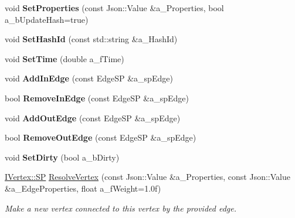 \begin{DoxyCompactItemize}
void {\bfseries Set\+Properties} (const Json\+::\+Value \&a\+\_\+\+Properties, bool a\+\_\+b\+Update\+Hash=true)
\item 
\mbox{\label{class_i_graph_1_1_i_vertex_aec151462d4cf7a56ed519dcacd9984f2}} 
void {\bfseries Set\+Hash\+Id} (const std\+::string \&a\+\_\+\+Hash\+Id)
\item 
\mbox{\label{class_i_graph_1_1_i_vertex_a5769d328cbfa14c64354db10b88d22ca}} 
void {\bfseries Set\+Time} (double a\+\_\+f\+Time)
\item 
\mbox{\label{class_i_graph_1_1_i_vertex_af5b4cb5dcf82ed01ed5b5a129fe3622f}} 
void {\bfseries Add\+In\+Edge} (const Edge\+SP \&a\+\_\+sp\+Edge)
\item 
\mbox{\label{class_i_graph_1_1_i_vertex_a4c0404d2c486c8c6bc3459f1230e270f}} 
bool {\bfseries Remove\+In\+Edge} (const Edge\+SP \&a\+\_\+sp\+Edge)
\item 
\mbox{\label{class_i_graph_1_1_i_vertex_af01d924d6e9c6fedf64680659f27ccfe}} 
void {\bfseries Add\+Out\+Edge} (const Edge\+SP \&a\+\_\+sp\+Edge)
\item 
\mbox{\label{class_i_graph_1_1_i_vertex_a94ffc85b9c85e91d2084931a6e2cfc05}} 
bool {\bfseries Remove\+Out\+Edge} (const Edge\+SP \&a\+\_\+sp\+Edge)
\item 
\mbox{\label{class_i_graph_1_1_i_vertex_a4602c192fbc7d21b9d099eb59c1453c7}} 
void {\bfseries Set\+Dirty} (bool a\+\_\+b\+Dirty)
\item 
\mbox{\label{class_i_graph_1_1_i_vertex_a8a2445e43dfc6b86a2a46682e9fa143f}} 
\hyperlink{class_i_graph_1_1_i_vertex_af72b9df91f110bc7824c608c10cc819c}{I\+Vertex\+::\+SP} \hyperlink{class_i_graph_1_1_i_vertex_a8a2445e43dfc6b86a2a46682e9fa143f}{Resolve\+Vertex} (const Json\+::\+Value \&a\+\_\+\+Properties, const Json\+::\+Value \&a\+\_\+\+Edge\+Properties, float a\+\_\+f\+Weight=1.\+0f)
\begin{DoxyCompactList}\small\item\em Make a new vertex connected to this vertex by the provided edge. \end{DoxyCompactList}\item 

\end{DoxyCompactItemize}
